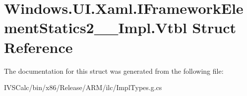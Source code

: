 \hypertarget{struct_windows_1_1_u_i_1_1_xaml_1_1_i_framework_element_statics2_____impl_1_1_vtbl}{}\section{Windows.\+U\+I.\+Xaml.\+I\+Framework\+Element\+Statics2\+\_\+\+\_\+\+Impl.\+Vtbl Struct Reference}
\label{struct_windows_1_1_u_i_1_1_xaml_1_1_i_framework_element_statics2_____impl_1_1_vtbl}


The documentation for this struct was generated from the following file\+:\begin{DoxyCompactItemize}
\item 
I\+V\+S\+Calc/bin/x86/\+Release/\+A\+R\+M/ilc/Impl\+Types.\+g.\+cs\end{DoxyCompactItemize}
